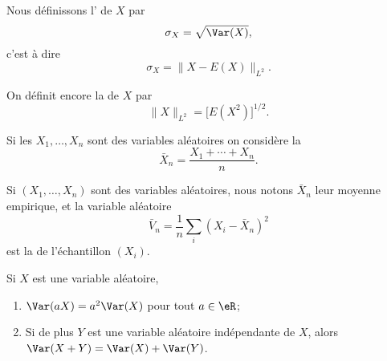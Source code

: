 \begin{definition}

	Nous définissons l' de \( X\) par
	\begin{equation}
		\sigma_X=\sqrt{\Var(X)},
	\end{equation}
	c'est à dire
	\begin{equation}
		\sigma_X=\| X-E(X) \|_{L^2}.
	\end{equation}
\end{definition}


\begin{definition}
	On définit encore la  de \( X\) par
	\begin{equation}
		\| X \|_{L^2}=\big[ E(X^2) \big]^{1/2}.
	\end{equation}
\end{definition}

\begin{definition}
	Si les \( X_1,\ldots,X_n\) sont des variables aléatoires on considère la 
	\begin{equation}
		\bar X_n=\frac{ X_1+\cdots+X_n }{ n }.
	\end{equation}
\end{definition}

\begin{definition}
	Si \( (X_1,\ldots,X_n)\) sont des variables aléatoires, nous notons \( \bar X_n\) leur moyenne empirique, et la variable aléatoire
	\begin{equation}
		\bar V_n=\frac{1}{ n }\sum_i(X_i-\bar X_n)^2
	\end{equation}
	est la  de l'échantillon \( (X_i)\).
\end{definition}

\begin{lemma}       \label{LemEXYEXEYindep}
	Si \( X\) est une variable aléatoire,
	\begin{enumerate}
		\item
		      \( \Var(aX)=a^2\Var(X)\) pour tout \( a\in\eR\);
		\item
		      Si de plus \( Y\) est une variable aléatoire indépendante de \( X\), alors \( \Var(X+Y)=\Var(X)+\Var(Y)\).
	\end{enumerate}
\end{lemma}

